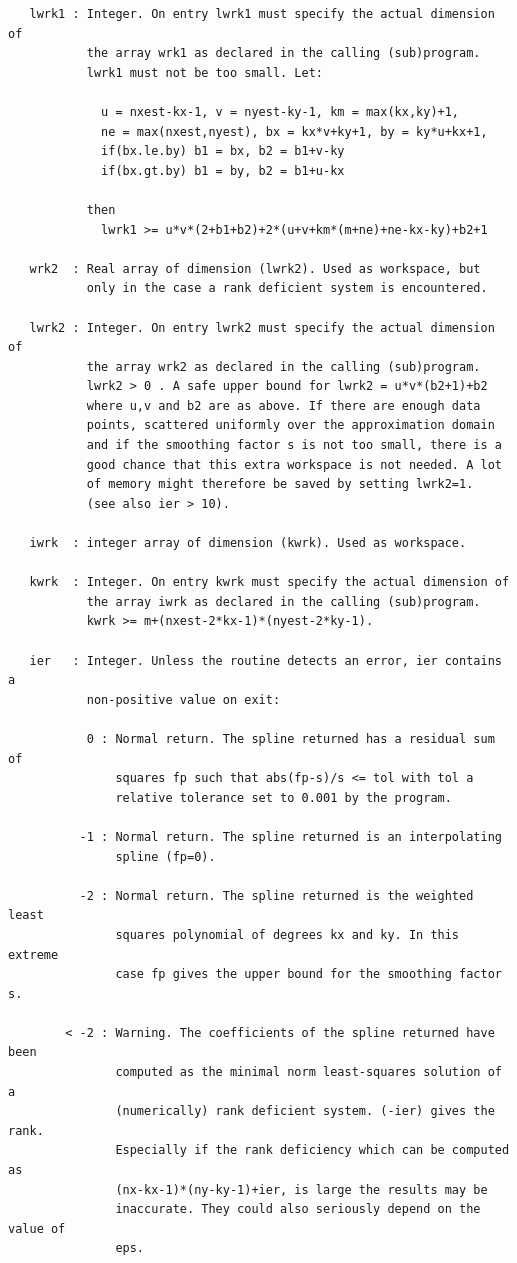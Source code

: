 \documentclass[11pt,twoside]{article}
\begin{document}
\begin{verbatim}
   lwrk1 : Integer. On entry lwrk1 must specify the actual dimension of
           the array wrk1 as declared in the calling (sub)program.
           lwrk1 must not be too small. Let:

             u = nxest-kx-1, v = nyest-ky-1, km = max(kx,ky)+1,
             ne = max(nxest,nyest), bx = kx*v+ky+1, by = ky*u+kx+1,
             if(bx.le.by) b1 = bx, b2 = b1+v-ky
             if(bx.gt.by) b1 = by, b2 = b1+u-kx

           then
             lwrk1 >= u*v*(2+b1+b2)+2*(u+v+km*(m+ne)+ne-kx-ky)+b2+1

   wrk2  : Real array of dimension (lwrk2). Used as workspace, but
           only in the case a rank deficient system is encountered.

   lwrk2 : Integer. On entry lwrk2 must specify the actual dimension of
           the array wrk2 as declared in the calling (sub)program.
           lwrk2 > 0 . A safe upper bound for lwrk2 = u*v*(b2+1)+b2
           where u,v and b2 are as above. If there are enough data
           points, scattered uniformly over the approximation domain
           and if the smoothing factor s is not too small, there is a
           good chance that this extra workspace is not needed. A lot
           of memory might therefore be saved by setting lwrk2=1.
           (see also ier > 10).

   iwrk  : integer array of dimension (kwrk). Used as workspace.

   kwrk  : Integer. On entry kwrk must specify the actual dimension of
           the array iwrk as declared in the calling (sub)program.
           kwrk >= m+(nxest-2*kx-1)*(nyest-2*ky-1).

   ier   : Integer. Unless the routine detects an error, ier contains a
           non-positive value on exit:

           0 : Normal return. The spline returned has a residual sum of
               squares fp such that abs(fp-s)/s <= tol with tol a
               relative tolerance set to 0.001 by the program.

          -1 : Normal return. The spline returned is an interpolating
               spline (fp=0).

          -2 : Normal return. The spline returned is the weighted least
               squares polynomial of degrees kx and ky. In this extreme
               case fp gives the upper bound for the smoothing factor s.

        < -2 : Warning. The coefficients of the spline returned have been
               computed as the minimal norm least-squares solution of a
               (numerically) rank deficient system. (-ier) gives the rank.
               Especially if the rank deficiency which can be computed as
               (nx-kx-1)*(ny-ky-1)+ier, is large the results may be
               inaccurate. They could also seriously depend on the value of
               eps.


\end{verbatim}
\end{document}
